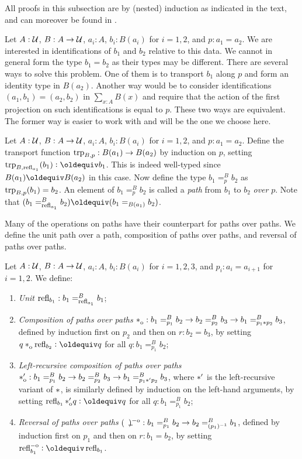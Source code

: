 \documentclass[a4paper,12pt]{amsart}
\begin{document}
All proofs in this subsection are by (nested) induction as indicated in the text,
and can moreover be found in \cite{paths-over-formalized}.

Let $A : \mathcal{U}$, $B : A \to \mathcal{U}$, $a_i:A$, $b_i:B(a_i)$ for $i=1,2$, and $p : a_1 = a_2$.
We are interested in identifications of $b_1$ and $b_2$ relative to this data.
We cannot in general form the type $b_1 = b_2$ as their types may be different.
There are several ways to solve this problem. One of them is to transport $b_1$ along
$p$ and form an identity type in $B(a_2)$. Another way would be to consider
identifications $(a_1,b_1) = (a_2,b_2)$ in $\sum_{x:A} B(x)$ and require that the
action of the first projection on such identifications is equal to $p$.
These two ways are equivalent.
The former way is easier to work with and will be the one we choose here.

\begin{definition}\label{def:pathover}
Let $A : \mathcal{U}$, $B : A \to \mathcal{U}$, $a_i:A$, $b_i:B(a_i)$ for $i=1,2$, and $p : a_1 = a_2$.
Define the transport function $\mathop{\mathrm{trp}_{B,p}} : B(a_1)\to B(a_2)$ by induction on $p$,
setting $\trp{B,\refl{a_1}}(b_1)\defeq b_1$. This is indeed well-typed since
$B(a_1)\jdeq B(a_2)$ in this case.
Now define the type $b_1 =^B_p b_2$ as $\mathop{\mathrm{trp}_{B,p}}(b_1) = b_2$.
An element of $b_1 =^B_p b_2$ is called
a \emph{path} from $b_1$ to $b_2$ \emph{over} $p$.
Note that $(b_1 =^B_{\refl{a_1}} b_2) \jdeq (b_1 =_{B(a_1)}  b_2)$.
\end{definition}

Many of the operations on paths have their counterpart for paths over paths.
We define the unit path over a path, composition of paths over paths, and reversal of paths over paths.

\begin{definition}\label{def:pathoveralgebra}
  Let $A : \mathcal{U}$, $B : A \to \mathcal{U}$, $a_i:A$, $b_i:B(a_i)$ for $i=1,2,3$, and
  $p_i : a_i = a_{i+1}$ for $i=1,2$. We define:
  \begin{enumerate}[topsep=3pt]
  \item \emph{Unit} $\mathop{{\mathrm{refl}}_{b_1}} : b_1 =^B_{\mathop{{\mathrm{refl}}_{a_1}}} b_1$;
  \item \emph{Composition of paths over paths}
    $\cto : b_1 =^B_{p_1} b_2 \to b_2 =^B_{p_2} b_3 \to b_1 =^B_{p_1 \ct p_2} b_3$,
    defined by induction first on $p_2$ and then on $r: b_2 = b_3$, by
    setting $q \cto \reflo{b_2} \defeq q$ for all $q: b_1 =^B_{p_1} b_2$;
  \item \emph{Left-recursive composition of paths over paths}
    $*_{\mathrm{o}}^\prime : b_1 =^B_{p_1} b_2 \to b_2 =^B_{p_2} b_3 \to b_1 =^B_{p_1 *' p_2} b_3$,
    where $*'$ is the left-recursive variant of $*$,
    is similarly defined by induction on the left-hand arguments, by setting
    $\reflo{b_1} \ctop q \defeq q$ for all $q: b_1 =^B_{p_1} b_2$;
  \item \emph{Reversal of paths over paths}
    $(\blank)\invo : b_1 =^B_{p_1} b_2 \to b_2 =^B_{(p_1)^{-1}} b_1$,
    defined by induction first on $p_1$ and then on $r: b_1 = b_2$, by
    setting $\refloi{b_1} \defeq \refl{b_1}$.
  \end{enumerate}
\end{definition}
\end{document}
